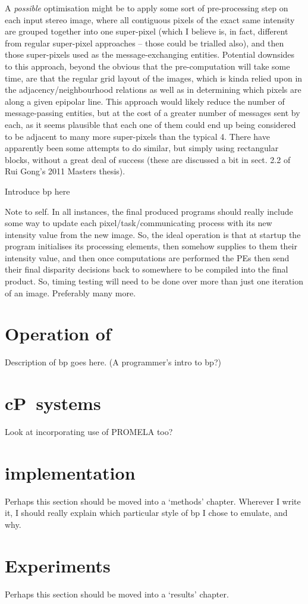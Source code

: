 A \emph{possible} optimisation might be to apply some sort of pre-processing step on each input stereo image, where all contiguous pixels of the exact same intensity are grouped together into one super-pixel (which I believe is, in fact, different from regular super-pixel approaches -- those could be trialled also), and then those super-pixels used as the message-exchanging entities.  Potential downsides to this approach, beyond the obvious that the pre-computation will take some time, are that the regular grid layout of the images, which is kinda relied upon in the adjacency/neighbourhood relations as well as in determining which pixels are along a given epipolar line.  This approach would likely reduce the number of message-passing entities, but at the cost of a greater number of messages sent by each, as it seems plausible that each one of them could end up being considered to be adjacent to many more super-pixels than the typical 4.  There have apparently been some attempts to do similar, but simply using rectangular blocks, without a great deal of success (these are discussed a bit in sect. 2.2 of Rui Gong's 2011 Masters thesis).

Introduce \gls{bp} here

Note to self.  In all instances, the final produced programs should really include some way to update each pixel/task/communicating process with its new intensity value from the new image.  So, the ideal operation is that at startup the program initialises its processing elements, then somehow supplies to them their intensity value, and then once computations are performed the PEs then send their final disparity decisions back to somewhere to be compiled into the final product.  So, timing testing will need to be done over more than just one iteration of an image.  Preferably many more.

\section{Operation of }
Description of \gls{bp} goes here.  (A programmer's intro to \gls{bp}?)

\section{cP~systems}


Look at incorporating use of PROMELA too?

\section{ implementation}

Perhaps this section should be moved into a `methods' chapter.  Wherever I write it, I should really explain which particular style of \gls{bp} I chose to emulate, and why.

\section{Experiments}

Perhaps this section should be moved into a `results' chapter.